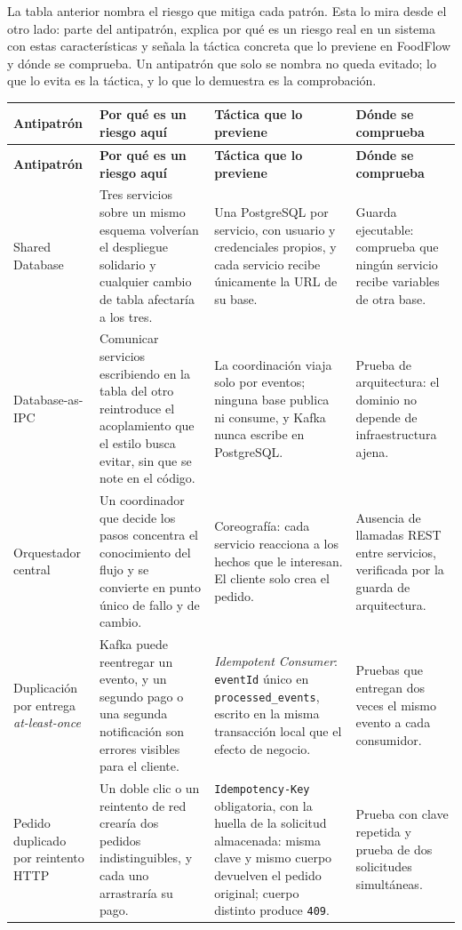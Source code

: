 \documentclass[12pt,a4paper]{article}
\begin{document}
La tabla anterior nombra el riesgo que mitiga cada patrón. Esta lo mira desde el otro lado: parte del antipatrón, explica por qué es un riesgo real en un sistema con estas características y señala la táctica concreta que lo previene en FoodFlow y dónde se comprueba. Un antipatrón que solo se nombra no queda evitado; lo que lo evita es la táctica, y lo que lo demuestra es la comprobación.

\scriptsize
\setlength{\tabcolsep}{3pt}
\begin{longtable}{P{0.17\textwidth} P{0.26\textwidth} P{0.30\textwidth} P{0.17\textwidth}}
\toprule
\textbf{Antipatrón} & \textbf{Por qué es un riesgo aquí} & \textbf{Táctica que lo previene} & \textbf{Dónde se comprueba} \\
\midrule
\endfirsthead
\toprule
\textbf{Antipatrón} & \textbf{Por qué es un riesgo aquí} & \textbf{Táctica que lo previene} & \textbf{Dónde se comprueba} \\
\midrule
\endhead
Shared Database & Tres servicios sobre un mismo esquema volverían el despliegue solidario y cualquier cambio de tabla afectaría a los tres. & Una PostgreSQL por servicio, con usuario y credenciales propios, y cada servicio recibe únicamente la URL de su base. & Guarda ejecutable: comprueba que ningún servicio recibe variables de otra base. \\
Database-as-IPC & Comunicar servicios escribiendo en la tabla del otro reintroduce el acoplamiento que el estilo busca evitar, sin que se note en el código. & La coordinación viaja solo por eventos; ninguna base publica ni consume, y Kafka nunca escribe en PostgreSQL. & Prueba de arquitectura: el dominio no depende de infraestructura ajena. \\
Orquestador central & Un coordinador que decide los pasos concentra el conocimiento del flujo y se convierte en punto único de fallo y de cambio. & Coreografía: cada servicio reacciona a los hechos que le interesan. El cliente solo crea el pedido. & Ausencia de llamadas REST entre servicios, verificada por la guarda de arquitectura. \\
Duplicación por entrega \textit{at-least-once} & Kafka puede reentregar un evento, y un segundo pago o una segunda notificación son errores visibles para el cliente. & \textit{Idempotent Consumer}: \texttt{eventId} único en \texttt{processed\_events}, escrito en la misma transacción local que el efecto de negocio. & Pruebas que entregan dos veces el mismo evento a cada consumidor. \\
Pedido duplicado por reintento HTTP & Un doble clic o un reintento de red crearía dos pedidos indistinguibles, y cada uno arrastraría su pago. & \texttt{Idempotency-Key} obligatoria, con la huella de la solicitud almacenada: misma clave y mismo cuerpo devuelven el pedido original; cuerpo distinto produce \texttt{409}. & Prueba con clave repetida y prueba de dos solicitudes simultáneas. \\

\end{longtable}
\end{document}
